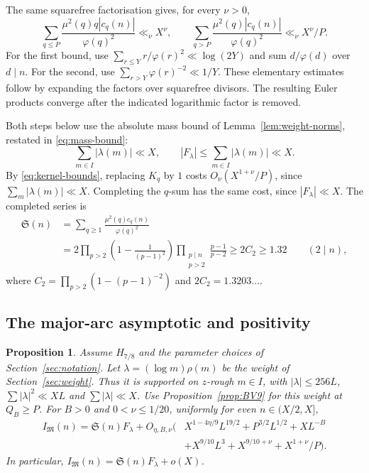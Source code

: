 \documentclass{amsart}
\newtheorem{proposition}[lemma]{Proposition}
\newcounter{fact}
\numberwithin{equation}{section}
\numberwithin{table}{section}
\newcommand{\M}{\mathfrak M}
\begin{document}
The same squarefree factorisation gives, for every $\nu>0$,
\begin{equation}\label{eq:singular-tails}
\sum_{q\le P}\frac{\mu^2(q)q|c_q(n)|}{\varphi(q)^2}\ll_\nu X^\nu,
\qquad
\sum_{q>P}\frac{\mu^2(q)|c_q(n)|}{\varphi(q)^2}\ll_\nu X^\nu/P.
\end{equation}
For the first bound, use
$\sum_{r\le Y}r/\varphi(r)^2\ll\log(2Y)$ and sum $d/\varphi(d)$ over $d\mid n$.
For the second, use $\sum_{r>Y}\varphi(r)^{-2}\ll1/Y$.
These elementary estimates follow by expanding the factors over squarefree
divisors. The resulting Euler products converge after the indicated
logarithmic factor is removed.

Both steps below use the absolute mass bound of Lemma~\ref{lem:weight-norms}, restated in \eqref{eq:mass-bound}:
\[
\sum_{m\in I}|\lambda(m)|\ll X,
\qquad |F_\lambda|\le\sum_{m\in I}|\lambda(m)|\ll X.
\]
By \eqref{eq:kernel-bounds}, replacing $K_q$ by $1$ costs
$O_\nu(X^{1+\nu}/P)$, since $\sum_m|\lambda(m)|\ll X$.
Completing the $q$-sum has the same cost, since $|F_\lambda|\ll X$.
The completed series is
\begin{equation}\label{eq:singular-series}
\begin{split}
\mathfrak S(n)
&=\sum_{q\ge1}\frac{\mu^2(q)c_q(n)}{\varphi(q)^2}\\
&=2\prod_{p>2}\left(1-\frac1{(p-1)^2}\right)
\prod_{\substack{p\mid n\\p>2}}\frac{p-1}{p-2}
\ge2C_2\ge1.32\qquad(2\mid n),
\end{split}
\end{equation}
where $C_2=\prod_{p>2}(1-(p-1)^{-2})$ and $2C_2=1.3203\ldots$.

\subsection{The major-arc asymptotic and positivity}

\begin{proposition}\label{prop:major-asymptotic}
Assume $H_{7/8}$ and the parameter choices of Section~\ref{sec:notation}.
Let $\lambda=(\log m)\rho(m)$ be the weight of Section~\ref{sec:weight}.
Thus it is supported on $z$-rough $m\in I$, with
$|\lambda|\le256L$, $\sum|\lambda|^2\ll XL$ and $\sum|\lambda|\ll X$.
Use Proposition~\ref{prop:BV9} for this weight at $Q_B\ge P$.
For $B>0$ and $0<\nu\le1/20$, uniformly for even $n\in(X/2,X]$,
\begin{equation}\label{eq:major-asymptotic}
\begin{split}
I_\M(n)=\mathfrak S(n)F_\lambda
+O_{\eta,B,\nu}\bigl(&X^{1-4\eta/9}L^{19/2}+P^{3/2}L^{1/2}+XL^{-B}\\
&+X^{9/10}L^3+X^{9/10+\nu}+X^{1+\nu}/P\bigr).
\end{split}
\end{equation}
In particular, $I_\M(n)=\mathfrak S(n)F_\lambda+o(X)$.
\end{proposition}
\end{document}

